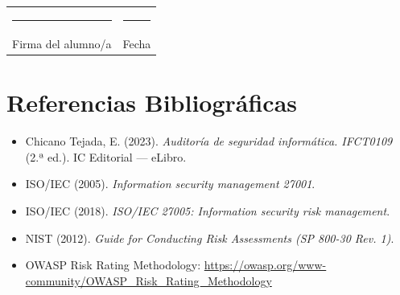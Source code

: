 \documentclass[11pt,a4paper]{article}
\begin{document}
\vspace{1.2cm}

\begin{center}
\begin{tabularx}{\textwidth}{@{} X X @{}}
\rule{6cm}{0.4pt} & \rule{6cm}{0.4pt} \\
Firma del alumno/a & Fecha \\
\end{tabularx}
\end{center}

\section{Referencias Bibliográficas}

\begin{itemize}[leftmargin=*]
  \item Chicano Tejada, E. (2023). \textit{Auditoría de seguridad informática. IFCT0109} (2.ª ed.). IC Editorial --- eLibro.
  \item ISO/IEC (2005). \textit{Information security management 27001}.
  \item ISO/IEC (2018). \textit{ISO/IEC 27005: Information security risk management}.
  \item NIST (2012). \textit{Guide for Conducting Risk Assessments (SP 800-30 Rev. 1)}.
  \item OWASP Risk Rating Methodology: \url{https://owasp.org/www-community/OWASP_Risk_Rating_Methodology}
\end{itemize}
\end{document}

